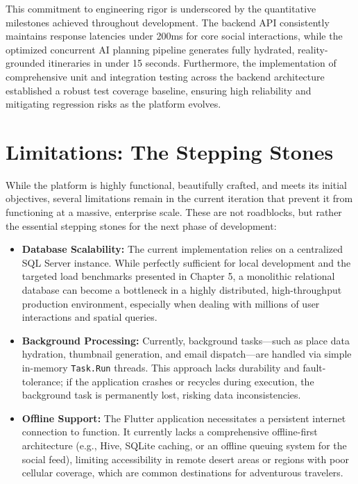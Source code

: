 This commitment to engineering rigor is underscored by the quantitative milestones achieved throughout development. The backend API consistently maintains response latencies under 200ms for core social interactions, while the optimized concurrent AI planning pipeline generates fully hydrated, reality-grounded itineraries in under 15 seconds. Furthermore, the implementation of comprehensive unit and integration testing across the backend architecture established a robust test coverage baseline, ensuring high reliability and mitigating regression risks as the platform evolves.

\section{Limitations: The Stepping Stones}
While the platform is highly functional, beautifully crafted, and meets its initial objectives, several limitations remain in the current iteration that prevent it from functioning at a massive, enterprise scale. These are not roadblocks, but rather the essential stepping stones for the next phase of development:

\begin{itemize}
    \item \textbf{Database Scalability:} The current implementation relies on a centralized SQL Server instance. While perfectly sufficient for local development and the targeted load benchmarks presented in Chapter 5, a monolithic relational database can become a bottleneck in a highly distributed, high-throughput production environment, especially when dealing with millions of user interactions and spatial queries.
    \item \textbf{Background Processing:} Currently, background tasks---such as place data hydration, thumbnail generation, and email dispatch---are handled via simple in-memory \texttt{Task.Run} threads. This approach lacks durability and fault-tolerance; if the application crashes or recycles during execution, the background task is permanently lost, risking data inconsistencies.
    \item \textbf{Offline Support:} The Flutter application necessitates a persistent internet connection to function. It currently lacks a comprehensive offline-first architecture (e.g., Hive, SQLite caching, or an offline queuing system for the social feed), limiting accessibility in remote desert areas or regions with poor cellular coverage, which are common destinations for adventurous travelers.
\end{itemize}

